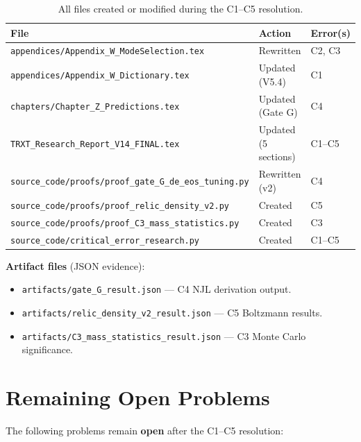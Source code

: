 \documentclass[11pt,a4paper]{article}
\begin{document}
\begin{table}[h]
\centering
\small
\begin{tabular}{@{}lll@{}}
\toprule
\textbf{File} & \textbf{Action} & \textbf{Error(s)} \\
\midrule
\texttt{appendices/Appendix\_W\_ModeSelection.tex} & Rewritten & C2, C3 \\
\texttt{appendices/Appendix\_W\_Dictionary.tex} & Updated (V5.4) & C1 \\
\texttt{chapters/Chapter\_Z\_Predictions.tex} & Updated (Gate G) & C4 \\
\texttt{TRXT\_Research\_Report\_V14\_FINAL.tex} & Updated (5 sections) & C1--C5 \\
\texttt{source\_code/proofs/proof\_gate\_G\_de\_eos\_tuning.py} & Rewritten (v2) & C4 \\
\texttt{source\_code/proofs/proof\_relic\_density\_v2.py} & Created & C5 \\
\texttt{source\_code/proofs/proof\_C3\_mass\_statistics.py} & Created & C3 \\
\texttt{source\_code/critical\_error\_research.py} & Created & C1--C5 \\
\bottomrule
\end{tabular}
\caption{All files created or modified during the C1--C5 resolution.}
\end{table}

\textbf{Artifact files} (JSON evidence):
\begin{itemize}
    \item \texttt{artifacts/gate\_G\_result.json} --- C4 NJL derivation output.
    \item \texttt{artifacts/relic\_density\_v2\_result.json} --- C5 Boltzmann results.
    \item \texttt{artifacts/C3\_mass\_statistics\_result.json} --- C3 Monte Carlo significance.
\end{itemize}

\section{Remaining Open Problems}
\label{sec:open}

The following problems remain \textbf{open} after the C1--C5 resolution:
\end{document}
